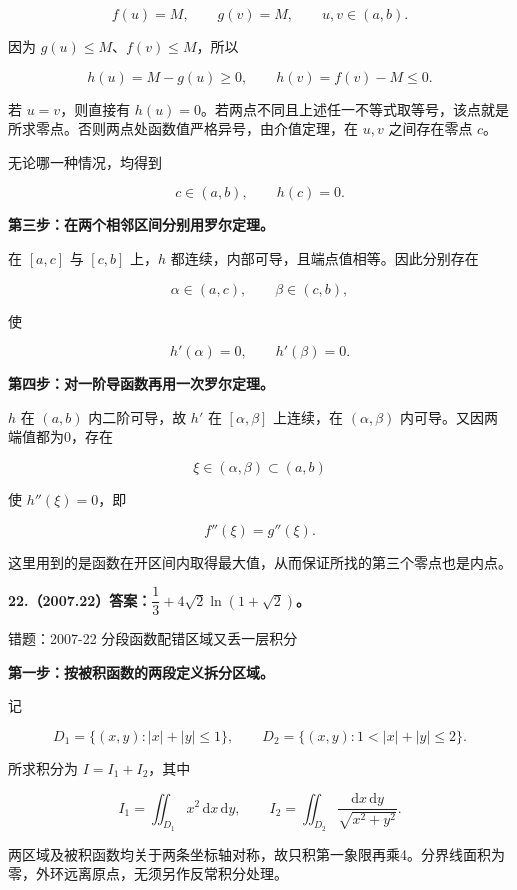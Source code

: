 \documentclass[UTF8,11pt,fontset=windows]{ctexart}
\begin{document}
$$
f(u)=M,\qquad g(v)=M,\qquad u,v\in(a,b).
$$

因为 $g(u)\le M$、$f(v)\le M$，所以

$$
h(u)=M-g(u)\ge0,
\qquad
h(v)=f(v)-M\le0.
$$

若 $u=v$，则直接有 $h(u)=0$。若两点不同且上述任一不等式取等号，该点就是所求零点。否则两点处函数值严格异号，由介值定理，在 $u,v$ 之间存在零点 $c$。

无论哪一种情况，均得到

$$
c\in(a,b),\qquad h(c)=0.
$$

\textbf{第三步：在两个相邻区间分别用罗尔定理。}

在 $[a,c]$ 与 $[c,b]$ 上，$h$ 都连续，内部可导，且端点值相等。因此分别存在

$$
\alpha\in(a,c),\qquad\beta\in(c,b),
$$

使

$$
h'(\alpha)=0,\qquad h'(\beta)=0.
$$

\textbf{第四步：对一阶导函数再用一次罗尔定理。}

$h$ 在 $(a,b)$ 内二阶可导，故 $h'$ 在 $[\alpha,\beta]$ 上连续，在 $(\alpha,\beta)$ 内可导。又因两端值都为0，存在

$$
\xi\in(\alpha,\beta)\subset(a,b)
$$

使 $h''(\xi)=0$，即

$$
\boxed{f''(\xi)=g''(\xi).}
$$

这里用到的是函数在开区间内取得最大值，从而保证所找的第三个零点也是内点。

\clearpage

\textbf{22.（2007.22）答案：$\dfrac13+4\sqrt2\ln(1+\sqrt2)$。}

\begingroup\color{gray}错题：2007-22 分段函数配错区域又丢一层积分\par\endgroup

\textbf{第一步：按被积函数的两段定义拆分区域。}

记

$$
D_1=\{(x,y):|x|+|y|\le1\},
\qquad
D_2=\{(x,y):1<|x|+|y|\le2\}.
$$

所求积分为 $I=I_1+I_2$，其中

$$
I_1=\iint_{D_1}x^2\,\mathrm dx\,\mathrm dy,
\qquad
I_2=\iint_{D_2}\frac{\mathrm dx\,\mathrm dy}{\sqrt{x^2+y^2}}.
$$

两区域及被积函数均关于两条坐标轴对称，故只积第一象限再乘4。分界线面积为零，外环远离原点，无须另作反常积分处理。
\end{document}
